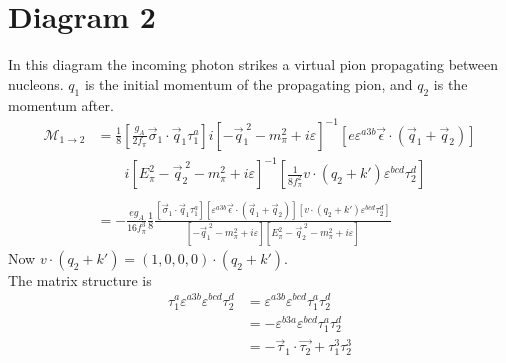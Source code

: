 \documentclass[11pt]{article}
\newcommand{\eps}{\epsilon}
\newcommand\ddfrac[2]{\frac{\displaystyle #1}{\displaystyle #2}}
\begin{document}
\section{Diagram 2}
In this diagram the incoming photon strikes a virtual pion propagating between nucleons. $q_1$ is the initial momentum of the propagating pion, and $q_2$ is the momentum after.
\begin{align}
    \mathcal{M}_{1\to2}&=\frac{1}{8}  \left[ \frac{g_{A}}{2 f_\pi} \vec{\sigma}_1 \cdot \vec{q}_1 \tau_1^a \right] 
    i \left[ -\vec{q}_1^{\;2} - m_\pi^2 + i \varepsilon  \right]^{-1}
    \left[ e \varepsilon^{a3b} \vec{\eps} \cdot (\vec{q}_1 + \vec{q}_2) \right]\nonumber\\
                &\qquad i \left[ E_\pi^2 - \vec{q}_2^{\;2} - m_\pi^2 + i \varepsilon \right]^{-1}
                \left[ \frac{1}{8 f_\pi^2} v \cdot \left( q_2 + k' \right) \varepsilon^{bcd} \tau_2^d  \right]\\
                &\nonumber\\
                &= -\frac{e g_A} {16 f_\pi^3} \frac{1}{8} 
                \ddfrac{
                    \left[\vec{\sigma}_1 \cdot \vec{q}_1 \tau_1^a\right]
                    \left[ \varepsilon^{a3b}\vec{\eps} \cdot (\vec{q}_1 + \vec{q}_2)\right]
                    \left[ v \cdot \left(q_2 + k'\right) \varepsilon^{bcd} \tau_2^d  \right]
                }{
                    \left[ -\vec{q}_1^{\;2} - m_\pi^2 + i \varepsilon  \right]
                    \left[E_\pi^2 - \vec{q}_2^{\;2} - m_\pi^2 + i \varepsilon\right]
                }
\end{align}
Now $v \cdot \left( q_2 + k' \right)= (1,0,0,0) \cdot \left( q_2 + k' \right)$.\\
The matrix structure is
\begin{align}
    \tau_1^a \varepsilon^{a3b} \varepsilon^{bcd} \tau_2^d&= \varepsilon^{a3b} \varepsilon^{bcd} \tau_1^a \tau_2^d\\
                                                         &=- \varepsilon^{b3a} \varepsilon^{bcd} \tau_1^a \tau_2^d\\
                                                         &= -\vec{\tau}_1 \cdot \vec{\tau_2} + \tau_1^3 \tau_2^3
\end{align}
\end{document}
